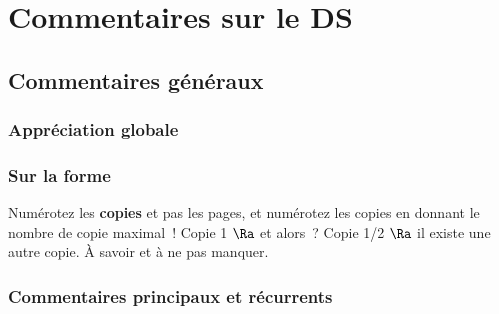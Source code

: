 \documentclass[a4paper, 12pt, final, garamond]{book}
\begin{document}
\setcounter{chapter}{3}

\def\lspace{25}

\chapter{Commentaires sur le DS }

\section{Commentaires généraux}
\subsection{Appréciation globale}
\subsection{Sur la forme}
Numérotez les \textbf{copies} et pas les pages, et numérotez les copies en
donnant le nombre de copie maximal~! Copie 1 $\Ra$ et alors~? Copie 1/2 $\Ra$
il existe une autre copie. À savoir et à ne pas manquer.

\subsection{Commentaires principaux et récurrents}


\setcounter{section}{0}
\end{document}
